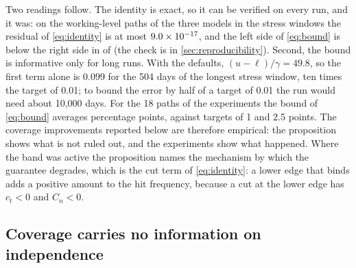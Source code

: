 Two readings follow. The identity is exact, so it can be verified on every run, and it was: on the \thA{} working-level paths of the three models in the stress windows the residual of \cref{eq:identity} is at most $9.0\times 10^{-17}$, and the left side of \cref{eq:bound} is below the right side in \thAHold{} of \thA{} (the check is in \cref{sec:reproducibility}). Second, the bound is informative only for long runs. With the defaults, $(u-\ell)/\gamma = 49.8$, so the first term alone is 0.099 for the 504 days of the longest stress window, ten times the target of 0.01; to bound the error by half of a target of 0.01 the run would need about 10,000 days. For the 18 paths of the experiments the bound of \cref{eq:bound} averages \thAMeanSimple{} percentage points, against targets of 1 and 2.5 points. The coverage improvements reported below are therefore empirical: the proposition shows what is not ruled out, and the experiments show what happened. Where the band was active the proposition names the mechanism by which the guarantee degrades, which is the cut term of \cref{eq:identity}: a lower edge that binds adds a positive amount to the hit frequency, because a cut at the lower edge has $c_t < 0$ and $C_n < 0$.

\subsection{Coverage carries no information on independence}
\label{sec:theory-independence}

